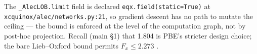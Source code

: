 \documentclass[11pt,letterpaper]{article}
\begin{document}
The \texttt{\_AlecLOB.limit} field is declared
\texttt{eqx.field(static=True)} at \texttt{xcquinox/alec/networks.py:21},
so gradient descent has no path to mutate the ceiling --- the bound is
enforced at the level of the computation graph, not by post-hoc projection.
Recall (main \S1) that 1.804 is PBE's stricter design choice; the bare
Lieb--Oxford bound permits $F_x \le 2.273$
\citep{LiebOxford1981, PerdewBurkeErnzerhof1996}.



\end{document}
